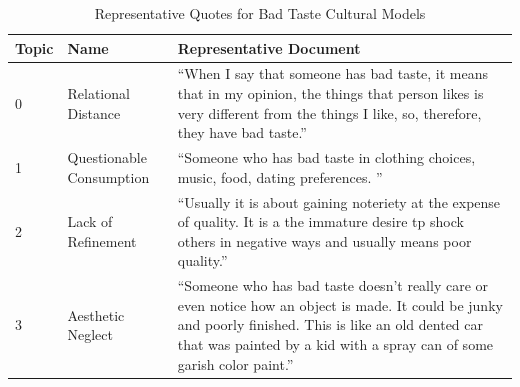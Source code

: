 \begin{table}[htpb]
\centering
\footnotesize
\begin{tabular}{lp{3.5cm}p{10cm}}
\toprule
Topic & Name & Representative Document \\
\midrule
0 & Relational Distance & ``When I say that someone has bad taste, it means that in my opinion, the things that person likes is very different from the things I like, so, therefore, they have bad taste.'' \\
1 & Questionable Consumption & ``Someone who has bad taste in clothing choices, music, food, dating preferences. '' \\
2 & Lack of Refinement & ``Usually it is about gaining noteriety at the expense of quality. It is a the immature desire tp shock others in negative ways and usually means poor quality.'' \\
3 & Aesthetic Neglect & ``Someone who has bad taste doesn't really care or even notice how an object is made. It could be junky and poorly finished. This is like an old dented car that was painted by a kid with a spray can of some garish color paint.'' \\
\bottomrule
\end{tabular}
\caption{Representative Quotes for Bad Taste Cultural Models}
\label{tab:bad_taste_rep_docs}
\end{table}
